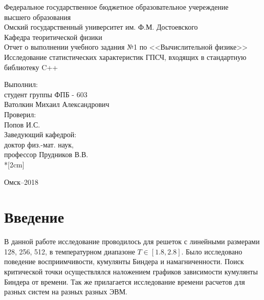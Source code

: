 \documentclass[12pt,a4paper]{article}
\begin{document}
	\begin{titlepage}
		\begin{center}
			Федеральное государственное бюджетное образовательное учереждение\\
			высшего образования\\[0.5cm]
			Омский государственный университет им. Ф.М. Достоевского\\[0.5cm]
			Кафедра теоритической физики\\[2cm]
			
			Отчет о выполнении учебного задания №1 по <<Вычислительной физике>>\\
			
			{\large{Исследование статистических характеристик ГПСЧ, входящих в стандартную библиотеку C++  }}\\[2cm]
		\end{center}
		
		\begin{flushright}
			Выполнил:\\ студент группы ФПБ - 603\\
			Ватолкин Михаил Александрович\\[2cm]
			Проверил:\\
			Попов И.С.\\[2cm]
			Заведующий кафедрой:\\
			доктор физ.-мат. наук,\\
			профессор Прудников В.В.\\*[2cm]
		\end{flushright}
		
		\begin{center}
			Омск--2018
		\end{center}
	\end{titlepage}
	\newpage
	
	\setcounter{page}{2} \tableofcontents
	\newpage
	\graphicspath{{pic/}}
		\section*{Введение}
	В данной работе исследование проводилось для решеток с линейными размерами 128, 256, 512, в температурном диапазоне $T \in[1.8, 2.8]$.
	Было исследовано поведение восприимчивости, кумулянты Биндера и намагниченности.
	Поиск критической точки осуществлялся наложением графиков зависимости кумулянты Биндера от времени.
	Так же прилагается исследование времени расчетов для разных систем на разных разных ЭВМ.
\end{document}
